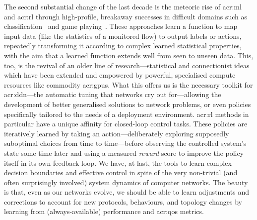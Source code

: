 The second substantial change of the last decade is the meteoric rise of \gls{acr:ml} and \gls{acr:rl} through high-profile, breakaway successes in difficult domains such as classification~\parencite{DBLP:conf/cvpr/HeZRS16} and game playing~\parencite{DBLP:journals/corr/abs-1912-06680,DBLP:journals/nature/SilverSSAHGHBLB17}.
These approaches learn a function to map input data (like the statistics of a monitored flow) to output labels or actions, repeatedly transforming it according to complex learned statistical properties, with the aim that a learned function extends well from seen to unseen data.
This, too, is the revival of an older line of research---statistical and connectionist ideas which have been extended and empowered by powerful, specialised compute resources like commodity \glspl{acr:gpu}.
What this offers us is the necessary toolkit for \gls{acr:ddn}---the automatic tuning that networks cry out for---allowing the development of better generalised solutions to network problems, or even policies specifically tailored to the needs of a deployment environment.
\gls{acr:rl} methods in particular have a unique affinity for closed-loop control tasks.
These policies are iteratively learned by taking an action---deliberately exploring supposedly suboptimal choices from time to time---before observing the controlled system's state some time later and using a measured \emph{reward} score to improve the policy itself in its own feedback loop.
We have, at last, the tools to learn complex decision boundaries and effective control in spite of the very non-trivial (and often surprisingly involved) system dynamics of computer networks.
The beauty is that, even as our networks evolve, we should be able to learn adjustments and corrections to account for new protocols, behaviours, and topology changes by learning from (always-available) performance and \gls{acr:qos} metrics.


